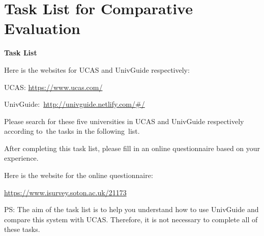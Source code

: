\chapter{Task List for Comparative Evaluation} \label{Chapter:Appendix B}




\begin{center}
\textbf{Task List}
\end{center}

Here is the websites for UCAS and UnivGuide respectively:

UCAS: \underline {https://www.ucas.com/}

UnivGuide:~\underline {http://univguide.netlify.com/{\#}/}

Please search for these five universities in UCAS and UnivGuide respectively 
according to~the tasks in the following~list. 

After completing this task list, please fill in an online questionnaire 
based on your experience.

Here is the website for the online questionnaire:

\underline {https://www.isurvey.soton.ac.uk/21173}

PS: The aim of the task list is to help you understand how to use UnivGuide 
and compare this system with UCAS. Therefore, it is not necessary to 
complete all of these tasks.

